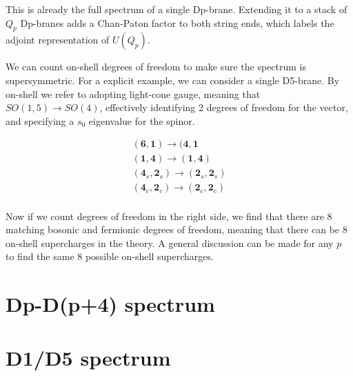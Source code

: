 This is already the full spectrum of a single Dp-brane. Extending it to a stack of $Q_p$ Dp-branes adds a Chan-Paton factor to both string ends, which labels the adjoint representation of $U(Q_p)$. 

We can count on-shell degrees of freedom to make sure the spectrum is supersymmetric. For a explicit example, we can consider a single D5-brane. By on-shell we refer to adopting light-cone gauge, meaning that $SO(1,5) \rightarrow SO(4)$, effectively identifying 2 degrees of freedom for the vector, and specifying a $s_0$ eigenvalue for the spinor.

\begin{align*}
    (\mathbf{6},\mathbf{1}) \rightarrow (\mathbf{4},\mathbf{1}\\
    (\mathbf{1},\mathbf{4}) \rightarrow (\mathbf{1}, \mathbf{4})\\
    (\mathbf{4}_s,\mathbf{2}_s) \rightarrow (\mathbf{2}_s,\mathbf{2}_s) \\
    (\mathbf{4}_c,\mathbf{2}_c) \rightarrow (\mathbf{2}_c,\mathbf{2}_c) \\
\end{align*}

Now if we count degrees of freedom in the right side, we find that there are 8 matching bosonic and fermionic degrees of freedom, meaning that there can be 8 on-shell supercharges in the theory. A general discussion can be made for any $p$ to find the same 8 possible on-shell supercharges. 

\section{Dp-D(p+4) spectrum}


\section{D1/D5 spectrum}